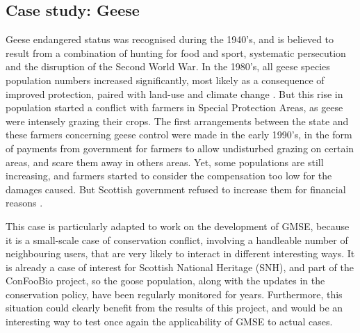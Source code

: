 \documentclass[12pt,a4paper]{article}
\begin{document}
\subsection{Case study: Geese}

Geese endangered status was recognised during the 1940's, and is believed to result from a combination of hunting for food and sport, systematic persecution and the disruption of the Second World War.
In the 1980's, all geese species population numbers increased significantly, most likely as a consequence of improved protection, paired with land-use and climate change \citep{mason2017changing}.
But this rise in population started a conflict with farmers in Special Protection Areas, as geese were intensely grazing their crops.
The first arrangements between the state and these farmers concerning geese control were made in the early 1990's, in the form of payments from government for farmers to allow undisturbed grazing on certain areas, and scare them away in others areas.
Yet, some populations are still increasing, and farmers started to consider the compensation too low for the damages caused.
But Scottish government refused to increase them for financial reasons \citep{bainbridge2017goose}.

This case is particularly adapted to work on the development of GMSE, because it is a small-scale case of conservation conflict, involving a handleable number of neighbouring users, that are very likely to interact in different interesting ways.
It is already a case of interest for Scottish National Heritage (SNH), and part of the ConFooBio project, so the goose population, along with the updates in the conservation policy, have been regularly monitored for years.
Furthermore, this situation could clearly benefit from the results of this project, and would be an interesting way to test once again the applicability of GMSE to actual cases.
\end{document}
